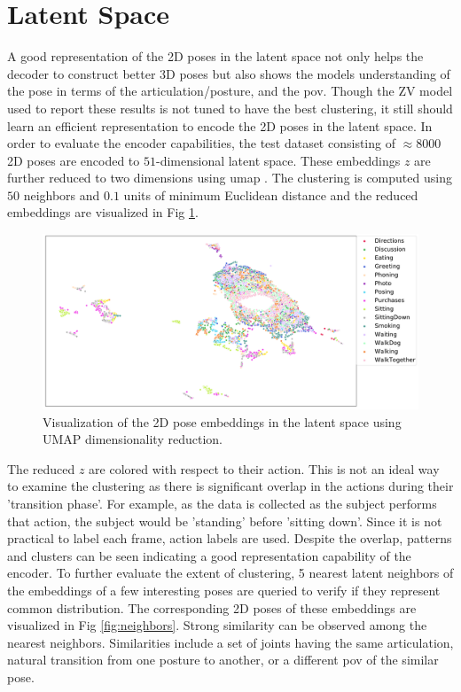 

\section{Latent Space}
A good representation of the 2D poses in the latent space not only helps the decoder to construct better 3D poses but also shows the models understanding of the pose in terms of the articulation/posture, and the \ac{pov}. Though the ZV model used to report these results is not tuned to have the best clustering, it still should learn an efficient representation to encode the 2D poses in the latent space. In order to evaluate the encoder capabilities, the test dataset consisting of $\approx 8000$ 2D poses are encoded to $51$-dimensional latent space. These embeddings $z$ are further reduced to two dimensions using \ac{umap} \cite{umap}. The clustering is computed using $50$ neighbors and $0.1$ units of minimum Euclidean distance and the reduced embeddings are visualized in Fig \ref{fig:latentspace}.

\begin{figure}[h]
    \centering
    \includegraphics[width=\linewidth]{figures/results/umap.pdf}
    \caption{Visualization of the 2D pose embeddings in the latent space using UMAP dimensionality reduction.}
    \label{fig:latentspace}
\end{figure}

The reduced $z$ are colored with respect to their action. This is not an ideal way to examine the clustering as there is significant overlap in the actions during their 'transition phase'. For example, as the data is collected as the subject performs that action, the subject would be 'standing' before 'sitting down'. Since it is not practical to label each frame, action labels are used. Despite the overlap, patterns and clusters can be seen indicating a good representation capability of the encoder. To further evaluate the extent of clustering, 5 nearest latent neighbors of the embeddings of a few interesting poses are queried to verify if they represent common distribution. The corresponding 2D poses of these embeddings are visualized in Fig \ref{fig:neighbors}. Strong similarity can be observed among the nearest neighbors. Similarities include a set of joints having the same articulation, natural transition from one posture to another, or a different \ac{pov} of the similar pose. 

